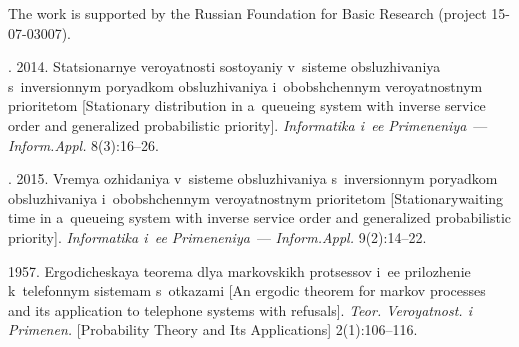



\vspace*{-16pt}

\Ack

\vspace*{-2pt}

\noindent
The work is supported by the
Russian Foundation for Basic Research (project 15-07-03007).


  \vspace*{-1pt}

  \begin{multicols}{2}
  

  

\renewcommand{\bibname}{\protect\rmfamily References}



{\small\frenchspacing
 {%
 \begin{thebibliography}{9}

\vspace*{-2pt}
. 2014.
Statsionarnye veroyatnosti so\-sto\-yaniy v~sisteme obslu\-zhi\-va\-niya 
s~inversionnym po\-ryad\-kom
ob\-slu\-zhi\-va\-niya i~obob\-shchen\-nym veroyatnostnym pri\-o\-ri\-te\-tom
[Stationary distribution in a~queueing system with inverse service order and
generalized probabilistic priority].
\textit{Informatika i~ee Primeneniya}~--- \textit{Inform.Appl.}
8(3):16--26.

. 2015.
Vremya ozhidaniya v~sis\-te\-me ob\-slu\-zhi\-va\-niya s~inversionnym poryadkom obsluzhivaniya 
i~obobshchennym veroyatnostnym prioritetom
[Stationary\linebreak waiting time in a~queueing system with inverse service order and
generalized probabilistic priority].
\textit{Informatika i~ee Primeneniya}~--- \textit{Inform.Appl.}
9(2):14--22.

 1957.
Ergodicheskaya teorema dlya markovskikh protsessov i~ee prilozhenie k~telefonnym 
sistemam s~otkazami
[An ergodic theorem for markov processes and its application to telephone systems with refusals].
\textit{Teor. Veroyatnost. i Primenen.} 
[Probability Theory and Its Applications] 2(1):106--116.




\end{thebibliography}}}
\end{multicols}
